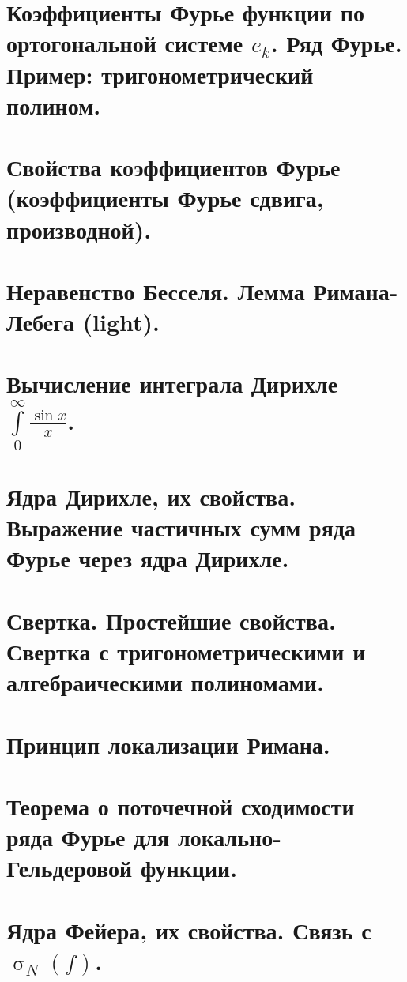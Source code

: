 \documentclass[11pt, fleqn]{article}
\begin{document}
\begin{Property}[3]
\begin{Property}[4]
\begin{Property}[2, аддитивность]
\begin{Proof}
\newpage
\section{Коэффициенты Фурье функции по ортогональной системе $e_k$. Ряд Фурье. Пример: тригонометрический полином.}


\newpage
\section{Свойства коэффициентов Фурье (коэффициенты Фурье сдвига, производной).}


\newpage
\section{Неравенство Бесселя. Лемма Римана-Лебега (light).}


\newpage
\section{Вычисление интеграла Дирихле $\int\limits_0^\infty \frac{\sin x}{x}$.}


\newpage
\section{Ядра Дирихле, их свойства. Выражение частичных сумм ряда Фурье через ядра Дирихле.}


\newpage
\section{Свертка. Простейшие свойства. Свертка с тригонометрическими и алгебраическими полиномами.}


\newpage
\section{Принцип локализации Римана.}


\newpage
\section{Теорема о поточечной сходимости ряда Фурье для локально-Гельдеровой функции.}


\newpage
\section{Ядра Фейера, их свойства. Связь с $\upsigma_N(f)$.}



\end{Proof}
\end{Property}
\end{Property}
\end{Property}
\end{document}
